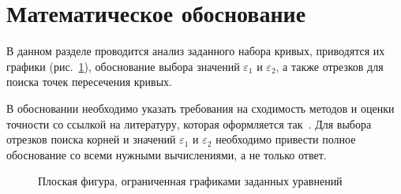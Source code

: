 \documentclass[a4paper,12pt,titlepage,finall]{article}
\begin{document}
\newpage

\section{Математическое обоснование}

В данном разделе проводится анализ заданного набора кривых, приводятся их графики (рис.~\ref{plot1}),
обоснование выбора значений $\varepsilon_1$ и $\varepsilon_2$, а также отрезков для поиска точек
пересечения кривых.

В обосновании необходимо указать требования на сходимость методов и оценки точности со ссылкой на
литературу, которая оформляется так~\cite{math}. Для выбора отрезков поиска корней и значений $\varepsilon_1$ и $\varepsilon_2$ необходимо
привести полное обоснование со всеми нужными вычислениями, а не только ответ.

\begin{figure}[h]
\centering
{}
\caption{Плоская фигура, ограниченная графиками заданных уравнений}
\label{plot1}
\end{figure}
\end{document}
